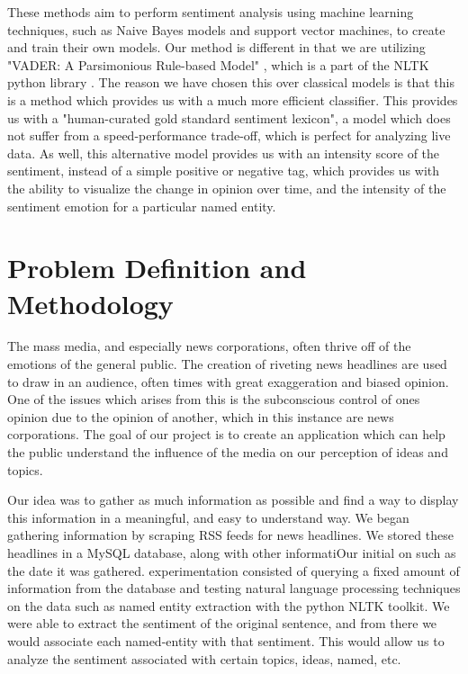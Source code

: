 \documentclass[12pt]{article}
\begin{document}
These methods aim to perform sentiment analysis using machine learning techniques, such as Naive Bayes models and support vector machines, to create and train their own models. Our method is different in that we are utilizing "VADER: A Parsimonious Rule-based Model" \cite{Hutto}, which is a part of the NLTK python library \cite{Sentiment}. The reason we have chosen this over classical models is that this is a method which provides us with a much more efficient classifier. This provides us with a "human-curated gold standard sentiment lexicon"\cite{Hutto}, a model which does not suffer from a speed-performance trade-off, which is perfect for analyzing live data. As well, this alternative model provides us with an intensity score of the sentiment, instead of a simple positive or negative tag, which provides us with the ability to visualize the change in opinion over time, and the intensity of the sentiment emotion for a particular named entity.

\section{Problem Definition and Methodology}
\hspace{\parindent} The mass media, and especially news corporations, often thrive off of the emotions of the general public. The creation of riveting news headlines are used to draw in an audience, often times with great exaggeration and biased opinion. One of the issues which arises from this is the subconscious control of ones opinion due to the opinion of another, which in this instance are news corporations. The goal of our project is to create an application which can help the public understand the influence of the media on our perception of ideas and topics. 

Our idea was to gather as much information as possible and find a way to display this information in a meaningful, and easy to understand way. We began gathering information by scraping RSS feeds for news headlines. We stored these headlines in a MySQL database, along with other informatiOur initial on such as the date it was gathered. experimentation consisted of querying a fixed amount of information from the database and testing natural language processing techniques on the data such as named entity extraction with the python NLTK toolkit. We were able to extract the sentiment of the original sentence, and from there we would associate each named-entity with that sentiment. This would allow us to analyze the sentiment associated with certain topics, ideas, named, etc. 
\end{document}
